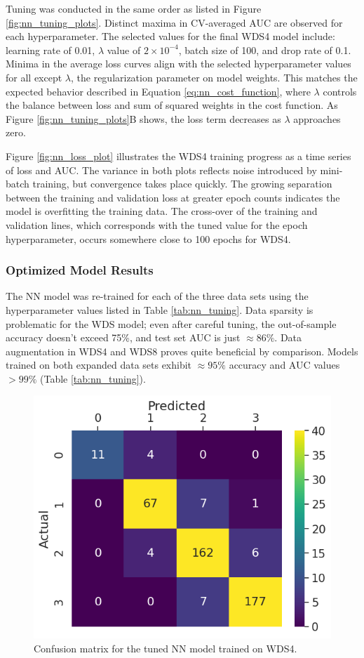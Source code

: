Tuning was conducted in the same order as listed in Figure \ref{fig:nn_tuning_plots}. Distinct maxima in CV-averaged AUC are observed for each hyperparameter. The selected values for the final WDS4 model include: learning rate of 0.01, $\lambda$ value of $2\times10^{-4}$, batch size of 100, and drop rate of 0.1. Minima in the average loss curves align with the selected hyperparameter values for all except $\lambda$, the regularization parameter on model weights. This matches the expected behavior described in Equation \ref{eq:nn_cost_function}, where $\lambda$ controls the balance between loss and sum of squared weights in the cost function. As Figure \ref{fig:nn_tuning_plots}B shows, the loss term decreases as $\lambda$ approaches zero.

Figure \ref{fig:nn_loss_plot} illustrates the WDS4 training progress as a time series of loss and AUC. The variance in both plots reflects noise introduced by mini-batch training, but convergence takes place quickly. The growing separation between the training and validation loss at greater epoch counts indicates the model is overfitting the training data. The cross-over of the training and validation lines, which corresponds with the tuned value for the epoch hyperparameter, occurs somewhere close to 100 epochs for WDS4.

\subsubsection{Optimized Model Results}

The NN model was re-trained for each of the three data sets using the hyperparameter values listed in Table \ref{tab:nn_tuning}. Data sparsity is problematic for the WDS model; even after careful tuning, the out-of-sample accuracy doesn't exceed 75\%, and test set AUC is just $\approx 86\%$. Data augmentation in WDS4 and WDS8 proves quite beneficial by comparison. Models trained on both expanded data sets exhibit $\approx95\%$ accuracy and AUC values $>99\%$ (Table \ref{tab:nn_tuning}).
 
\begin{figure}[htp]
\centering
\includegraphics[width=.5\textwidth]{templates/images/Figure-NN-ConfusionMatrix_WDS4.png}
\singlespacing
\caption[Neural network confusion matrix]{Confusion matrix for the tuned NN model trained on WDS4.}
\label{fig:nn_confusion_matrix}
\end{figure}

